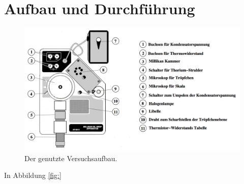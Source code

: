  \section{Aufbau und Durchführung}
\label{sec:Durchführung}

\begin{figure}
  \centering
  \includegraphics[width = \textwidth]{PicturePerfect/aufbau.pdf}
  \caption{Der genutzte Versuchsaufbau.\cite{anleitung}}
  \label{fig:aufbau}
\end{figure}

In Abbildung \ref{fig:}
